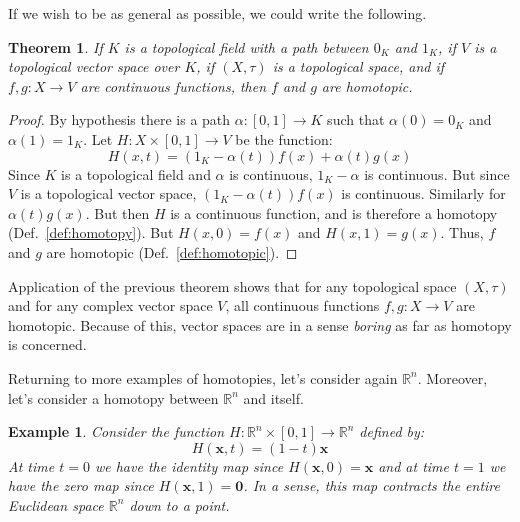 \documentclass{article}
\theoremstyle{plain}
\newtheorem{theorem}{Theorem}[section]
\theoremstyle{normal}
\newtheorem{example}{Example}[section]
\begin{document}
        If we wish to be as general as possible, we could write the following.
        \begin{theorem}
            If $K$ is a topological field with a path between $0_{K}$ and
            $1_{K}$, if $V$ is a topological vector space over $K$, if
            $(X,\tau)$ is a topological space, and if $f,g:X\rightarrow{V}$
            are continuous functions, then $f$ and $g$ are homotopic.
        \end{theorem}
        \begin{proof}
            By hypothesis there is a path $\alpha:[0,1]\rightarrow{K}$ such
            that $\alpha(0)=0_{K}$ and $\alpha(1)=1_{K}$. Let
            $H:X\times[0,1]\rightarrow{V}$ be the function:
            \begin{equation}
                H(x,t)=(1_{K}-\alpha(t))f(x)+\alpha(t)g(x)
            \end{equation}
            Since $K$ is a topological field and $\alpha$ is continuous,
            $1_{K}-\alpha$ is continuous. But since $V$ is a topological
            vector space, $(1_{K}-\alpha(t))f(x)$ is continuous. Similarly for
            $\alpha(t)g(x)$. But then $H$ is a continuous function, and is
            therefore a homotopy (Def.~\ref{def:homotopy}). But
            $H(x,0)=f(x)$ and $H(x,1)=g(x)$. Thus, $f$ and $g$ are homotopic
            (Def.~\ref{def:homotopic}).
        \end{proof}
        Application of the previous theorem shows that for any topological
        space $(X,\tau)$ and for any complex vector space $V$, all continuous
        functions $f,g:X\rightarrow{V}$ are homotopic. Because of this,
        vector spaces are in a sense \textit{boring} as far as homotopy is
        concerned.
        \par\hfill\par
        Returning to more examples of homotopies, let's consider again
        $\mathbb{R}^{n}$. Moreover, let's consider a homotopy between
        $\mathbb{R}^{n}$ and itself.
        \begin{example}
            Consider the function
            $H:\mathbb{R}^{n}\times[0,1]\rightarrow\mathbb{R}^{n}$ defined by:
            \begin{equation}
                H(\mathbf{x},t)=(1-t)\mathbf{x}
            \end{equation}
            At time $t=0$ we have the identity map since
            $H(\mathbf{x},0)=\mathbf{x}$ and at time $t=1$ we have the zero
            map since $H(\mathbf{x},1)=\mathbf{0}$. In a sense, this map
            \textit{contracts} the entire Euclidean space $\mathbb{R}^{n}$ down
            to a point. 
        \end{example}
\end{document}
